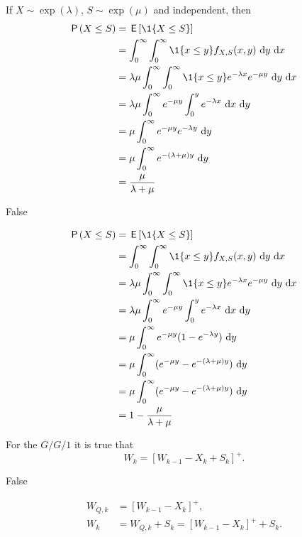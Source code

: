 \begin{exercise}[201704] %
   If $X\sim \exp(\lambda)$, $S\sim\exp(\mu)$ and independent, 
then
\begin{equation*}
  \begin{split}
    \P{X\leq S} 
&= \E{\1{X\leq S}} \\
&= \int_0^\infty \int_0^\infty \1{x\leq y} f_{X,S}(x,y)\, \d y\,\d x\\
&= \lambda \mu \int_0^\infty \int_0^\infty \1{x\leq y} e^{-\lambda x} e^{-\mu y} \, \d y\,\d x\\
&= \lambda \mu \int_0^\infty e^{-\mu y} \int_0^y e^{-\lambda x}\, \d x \, \d y \\
&= \mu \int_0^\infty e^{-\mu y} e^{-\lambda y}\,\d y\\
&= \mu \int_0^\infty e^{-(\lambda +\mu)y} \,\d y\\
&= \frac{\mu}{\lambda + \mu} 
  \end{split}
\end{equation*}

\begin{solution}
False

\begin{equation*}
  \begin{split}
    \P{X\leq S} 
&= \E{\1{X\leq S}} \\
&= \int_0^\infty \int_0^\infty \1{x\leq y} f_{X,S}(x,y)\, \d y\,\d x\\
&= \lambda \mu \int_0^\infty \int_0^\infty \1{x\leq y} e^{-\lambda x} e^{-\mu y} \, \d y\,\d x\\
&= \lambda \mu \int_0^\infty e^{-\mu y} \int_0^y e^{-\lambda x}\, \d x \, \d y \\
&= \mu \int_0^\infty e^{-\mu y} (1-e^{-\lambda y})\,\d y\\
&= \mu \int_0^\infty (e^{-\mu y} - e^{-(\lambda +\mu)y} ) \,\d y\\
&= \mu \int_0^\infty (e^{-\mu y} - e^{-(\lambda +\mu)y} ) \,\d y\\
&= 1 - \frac{\mu}{\lambda + \mu} 
  \end{split}
\end{equation*}

\end{solution}
\end{exercise}

\begin{exercise}[201704] %
For the $G/G/1$ it is true that
\begin{equation*}
  W_{k} = [W_{k-1} - X_k + S_k]^+.
\end{equation*}

\begin{solution}
  False

\begin{equation}
  \begin{split}
  W_{Q,k} &= [W_{k-1} - X_k]^+,\\
  W_{k} &= W_{Q,k} + S_k = [W_{k-1} - X_k]^+ + S_k.
  \end{split}
\end{equation}
\end{solution}
\end{exercise}

